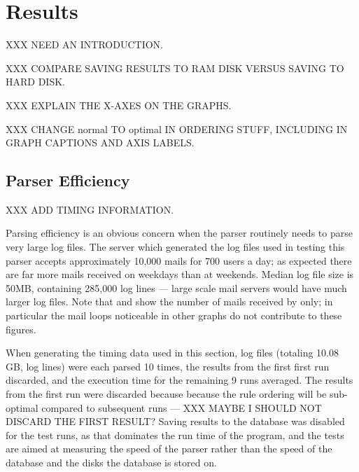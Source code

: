 \section{Results}

XXX NEED AN INTRODUCTION\@.

XXX COMPARE SAVING RESULTS TO RAM DISK VERSUS SAVING TO HARD DISK\@.

XXX EXPLAIN THE X-AXES ON THE GRAPHS\@.

XXX CHANGE normal TO optimal IN ORDERING STUFF, INCLUDING IN GRAPH CAPTIONS
AND AXIS LABELS\@.

\subsection{Parser Efficiency}

\label{parser efficiency}

XXX ADD TIMING INFORMATION\@.

Parsing efficiency is an obvious concern when the parser routinely needs to
parse very large log files.  The server which generated the log files used
in testing this parser accepts approximately 10,000 mails for 700 users a
day; as expected there are far more mails received on weekdays than at
weekends.   Median log file size is 50MB, containing 285,000 log lines ---
large scale mail servers would have much larger log files.  Note that
 and  show the number of mails received by \SMTP{} only; in
particular the mail loops noticeable in other graphs do not contribute to
these figures.



When generating the timing data used in this section, \numberOFlogFILES{}
log files (totaling 10.08 GB, \numberOFlogLINEShuman{} log lines) were each
parsed 10 times, the results from the first first run discarded, and the
execution time for the remaining 9 runs averaged.  The results from the
first run were discarded because because the rule ordering will be
sub-optimal compared to subsequent runs --- XXX MAYBE I SHOULD NOT DISCARD
THE FIRST RESULT\@?  Saving results to the database was disabled for the
test runs, as that dominates the run time of the program, and the tests are
aimed at measuring the speed of the parser rather than the speed of the
database and the disks the database is stored on.

